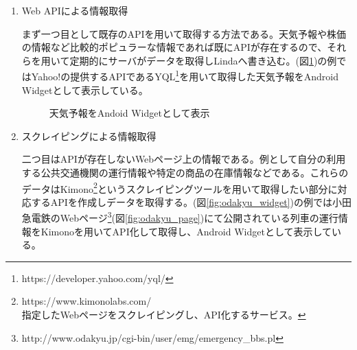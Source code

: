 \begin{enumerate}
 \item Web APIによる情報取得

まず一つ目として既存のAPIを用いて取得する方法である。天気予報や株価の情報など比較的ポピュラーな情報であれば既にAPIが存在するので、それらを用いて定期的にサーバがデータを取得しLindaへ書き込む。(図\ref{fig:weather_widget})の例ではYahoo!の提供するAPIであるYQL\footnote{https://developer.yahoo.com/yql/}を用いて取得した天気予報をAndroid Widgetとして表示している。

\begin{figure}[htbp]
  \begin{minipage}{\hsize}
    \begin{center}
    \end{center}
    \caption{天気予報をAndoid Widgetとして表示}
    \label{fig:weather_widget}
  \end{minipage}
\end{figure}

 \item スクレイピングによる情報取得

二つ目はAPIが存在しないWebページ上の情報である。例として自分の利用する公共交通機関の運行情報や特定の商品の在庫情報などである。これらのデータはKimono\footnote{https://www.kimonolabs.com/\\指定したWebページをスクレイピングし、API化するサービス。}というスクレイピングツールを用いて取得したい部分に対応するAPIを作成しデータを取得する。(図\ref{fig:odakyu_widget})の例では小田急電鉄のWebページ\footnote{http://www.odakyu.jp/cgi-bin/user/emg/emergency\_bbs.pl}(図\ref{fig:odakyu_page})にて公開されている列車の運行情報をKimonoを用いてAPI化して取得し、Android Widgetとして表示している。


\end{enumerate}
